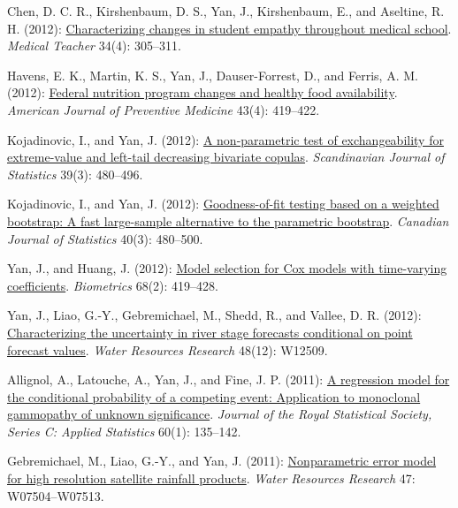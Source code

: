 \begin{RefereedJournalArticles}
\item Chen, D. C. R., Kirshenbaum, D. S., Yan, J., Kirshenbaum, E., and
Aseltine, R. H. (2012):
\href{https://doi.org/10.3109/0142159x.2012.644600}{Characterizing
changes in student empathy throughout medical school}. \emph{Medical
Teacher} 34(4): 305--311.

\item Havens, E. K., Martin, K. S., Yan, J., Dauser-Forrest, D., and Ferris,
A. M. (2012):
\href{https://doi.org/10.1016/j.amepre.2012.06.009}{Federal nutrition
program changes and healthy food availability}. \emph{American Journal
of Preventive Medicine} 43(4): 419--422.

\item Kojadinovic, I., and Yan, J. (2012):
\href{https://doi.org/10.1111/j.1467-9469.2011.00772.x}{A non-parametric
test of exchangeability for extreme-value and left-tail decreasing
bivariate copulas}. \emph{Scandinavian Journal of Statistics} 39(3):
480--496.

\item Kojadinovic, I., and Yan, J. (2012):
\href{https://doi.org/10.1002/cjs.11135}{Goodness-of-fit testing based
on a weighted bootstrap: A fast large-sample alternative to the
parametric bootstrap}. \emph{Canadian Journal of Statistics} 40(3):
480--500.

\item Yan, J., and Huang, J. (2012):
\href{https://doi.org/10.1111/j.1541-0420.2011.01692.x}{Model selection
for Cox models with time-varying coefficients}. \emph{Biometrics} 68(2):
419--428.

\item Yan, J., Liao, G.-Y., Gebremichael, M., Shedd, R., and Vallee, D. R.
(2012): \href{https://doi.org/10.1029/2012wr011818}{Characterizing the
uncertainty in river stage forecasts conditional on point forecast
values}. \emph{Water Resources Research} 48(12): W12509.

\item Allignol, A., Latouche, A., Yan, J., and Fine, J. P. (2011):
\href{https://doi.org/10.1111/j.1467-9876.2010.00729.x}{A regression
model for the conditional probability of a competing event: Application
to monoclonal gammopathy of unknown significance}. \emph{Journal of the
Royal Statistical Society, Series C: Applied Statistics} 60(1):
135--142.

\item Gebremichael, M., Liao, G.-Y., and Yan, J. (2011):
\href{https://doi.org/10.1029/2010WR009667}{Nonparametric error model
for high resolution satellite rainfall products}. \emph{Water Resources
Research} 47: W07504--W07513.


\end{RefereedJournalArticles}

